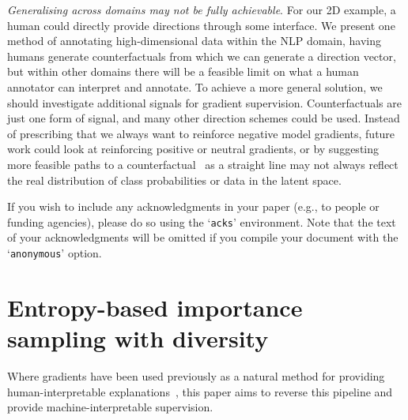 \documentclass[sigconf,anonymous]{aamas}
\begin{document}
\emph{Generalising across domains may not be fully achievable}. For our 2D example, a human could directly provide directions through some interface.
We present one method of annotating high-dimensional data within the NLP domain, having humans generate counterfactuals from which we can generate a direction vector, but within other domains there will be a feasible limit on what a human annotator can interpret and annotate. To achieve a more general solution, we should investigate additional signals for gradient supervision. Counterfactuals are just one form of signal, and many other direction schemes could be used. Instead of prescribing that we always want to reinforce negative model gradients, future work could look at reinforcing positive or neutral gradients, or by suggesting more feasible paths to a counterfactual~\cite{poyiadzi2020face} as a straight line may not always reflect the real distribution of class probabilities or data in the latent space.


\begin{acks}
If you wish to include any acknowledgments in your paper (e.g., to 
people or funding agencies), please do so using the `\texttt{acks}' 
environment. Note that the text of your acknowledgments will be omitted
if you compile your document with the `\texttt{anonymous}' option.
\end{acks}



 


\appendix

\section{Entropy-based importance sampling with diversity}
Where gradients have been used previously as a natural method for providing human-interpretable explanations~\cite{simonyan2013deep}, this paper aims to reverse this pipeline and provide machine-interpretable supervision.
\end{document}
